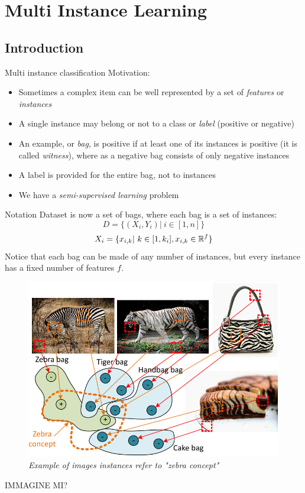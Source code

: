\section{Multi Instance Learning}
 
\subsection*{Introduction}
\begin{frame}{Multi instance classification}
	Motivation:
	\begin{itemize}\setlength\itemsep{1em}
		\item Sometimes a complex item can be well represented by a set of \textit{features} or \textit{instances}
		\item A single instance may belong or not to a class or \textit{label} (positive or negative)
		\item An example, or \textit{bag}, is positive if at least one of its instances is positive (it is called \textit{witness}), where as a negative bag consists of only negative instances
		\item A label is provided for the
		entire bag, not to instances
		\item We have a \textit{semi-supervised learning} problem
	\end{itemize}
	\begin{flushright}
		\cite{mi1}
	\end{flushright}
\end{frame}

\begin{frame}{Notation}
	Dataset is now a set of bags, where each bag is a set of instances:
	$$D = \{(X_i, Y_i) | \ i \in [1, n]\}$$
	$$X_i = \{x_{i,k} | \ k \in [1, k_i], x_{i,k} \in \mathbb{R}^f\}$$
	Notice that each bag can be made of any number of instances, but every instance has a fixed number of features $f$.
	\begin{figure}[htbp]
		\centering
		\includegraphics[scale = 0.15]{./images/mi3.png}
		\caption{\textit{Example of images instances refer to "zebra concept"}}
	\end{figure}
	\color{red}IMMAGINE MI?
\end{frame}

